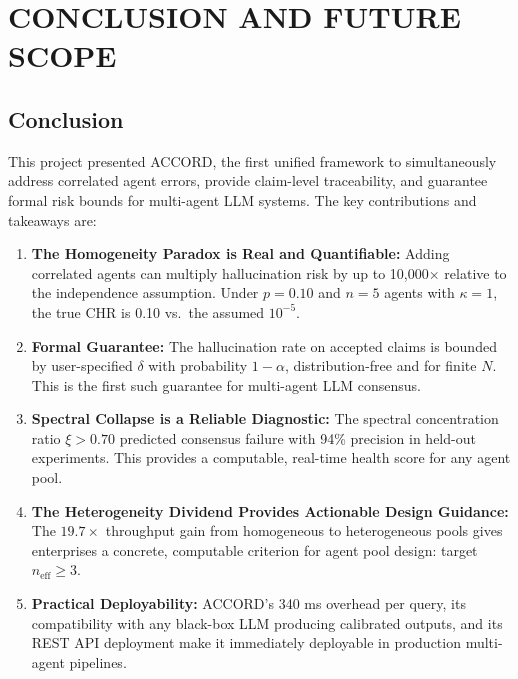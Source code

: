 \documentclass[12pt,a4paper]{report}
\begin{document}
\chapter{CONCLUSION AND FUTURE SCOPE}

\section{Conclusion}

This project presented ACCORD, the first unified framework to simultaneously address correlated agent errors, provide claim-level traceability, and guarantee formal risk bounds for multi-agent LLM systems. The key contributions and takeaways are:

\begin{enumerate}
    \item \textbf{The Homogeneity Paradox is Real and Quantifiable:} Adding correlated agents can multiply hallucination risk by up to 10,000$\times$ relative to the independence assumption. Under $p = 0.10$ and $n = 5$ agents with $\kappa = 1$, the true CHR is 0.10 vs.\ the assumed $10^{-5}$.

    \item \textbf{Formal Guarantee:} The hallucination rate on accepted claims is bounded by user-specified $\delta$ with probability $1 - \alpha$, distribution-free and for finite $N$. This is the first such guarantee for multi-agent LLM consensus.

    \item \textbf{Spectral Collapse is a Reliable Diagnostic:} The spectral concentration ratio $\xi > 0.70$ predicted consensus failure with 94\% precision in held-out experiments. This provides a computable, real-time health score for any agent pool.

    \item \textbf{The Heterogeneity Dividend Provides Actionable Design Guidance:} The $19.7\times$ throughput gain from homogeneous to heterogeneous pools gives enterprises a concrete, computable criterion for agent pool design: target $n_{\text{eff}} \geq 3$.

    \item \textbf{Practical Deployability:} ACCORD's 340 ms overhead per query, its compatibility with any black-box LLM producing calibrated outputs, and its REST API deployment make it immediately deployable in production multi-agent pipelines.
\end{enumerate}
\end{document}
